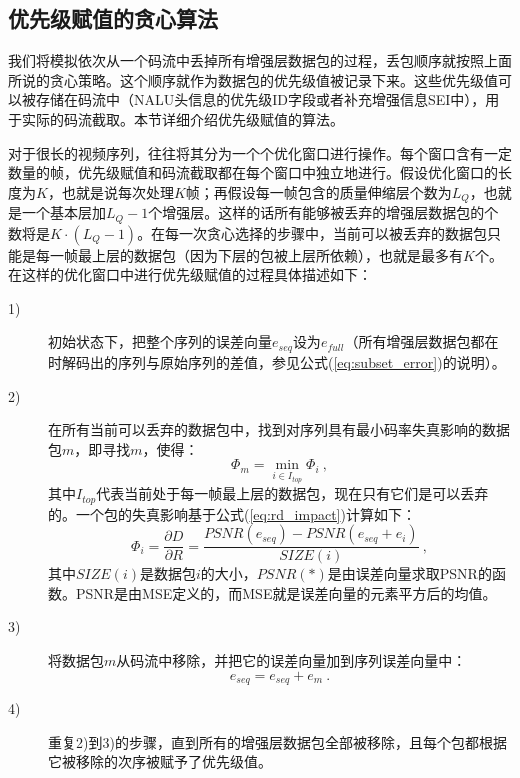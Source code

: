 \subsection{优先级赋值的贪心算法}
\label{subsec:priority-assign}

我们将模拟依次从一个码流中丢掉所有增强层数据包的过程，丢包顺序就按照上面所说的贪心策略。这个顺序就作为数据包的优先级值被记录下来。这些优先级值可以被存储在码流中（NALU头信息的优先级ID字段或者补充增强信息SEI中），用于实际的码流截取。本节详细介绍优先级赋值的算法。

对于很长的视频序列，往往将其分为一个个优化窗口进行操作。每个窗口含有一定数量的帧，优先级赋值和码流截取都在每个窗口中独立地进行。假设优化窗口的长度为$K$，也就是说每次处理$K$帧；再假设每一帧包含的质量伸缩层个数为$L_Q$，也就是一个基本层加$L_Q-1$个增强层。这样的话所有能够被丢弃的增强层数据包的个数将是$K \cdot (L_Q-1)$。在每一次贪心选择的步骤中，当前可以被丢弃的数据包只能是每一帧最上层的数据包（因为下层的包被上层所依赖），也就是最多有$K$个。在这样的优化窗口中进行优先级赋值的过程具体描述如下：

\begin{description}
	\item[1)] 初始状态下，把整个序列的误差向量$e_{seq}$设为$e_{full}$（所有增强层数据包都在时解码出的序列与原始序列的差值，参见公式(\ref{eq:subset_error})的说明）。
	\item[2)] 在所有当前可以丢弃的数据包中，找到对序列具有最小码率失真影响的数据包$m$，即寻找$m$，使得：
	\begin{equation}
	\label{eq:R-D_impact_m}
	\Phi_m = \min_{i \in I_{top}} \Phi_i \: ,
	\end{equation}
	其中$I_{top}$代表当前处于每一帧最上层的数据包，现在只有它们是可以丢弃的。一个包的失真影响基于公式(\ref{eq:rd_impact})计算如下： 
	\begin{equation}
	\label{eq:R-D_impact_i}
	\Phi_i = \dfrac{\partial D}{\partial R} = \dfrac{PSNR(e_{seq}) - PSNR(e_{seq} + e_i)}{SIZE(i)} \: ,
	\end{equation}
	其中$SIZE(i)$是数据包$i$的大小，$PSNR(*)$是由误差向量求取PSNR的函数。PSNR是由MSE定义的，而MSE就是误差向量的元素平方后的均值。
	\item[3)]将数据包$m$从码流中移除，并把它的误差向量加到序列误差向量中：
	\begin{equation}
	\label{eq:error_update}
	e_{seq} = e_{seq} + e_m \: .
	\end{equation}
	\item[4)]重复2)到3)的步骤，直到所有的增强层数据包全部被移除，且每个包都根据它被移除的次序被赋予了优先级值。
\end{description}

